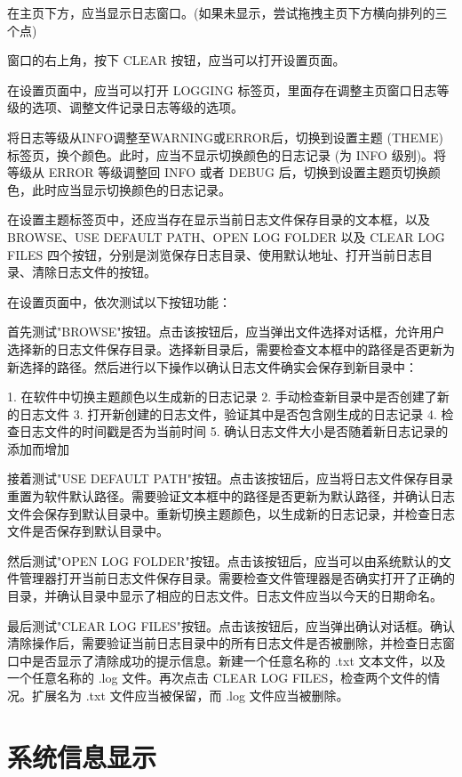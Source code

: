\documentclass[a4paper,12pt]{report}	%
\begin{document}
在主页下方，应当显示日志窗口。(如果未显示，尝试拖拽主页下方横向排列的三个点)

窗口的右上角，按下 CLEAR 按钮，应当可以打开设置页面。

在设置页面中，应当可以打开 LOGGING 标签页，里面存在调整主页窗口日志等级的选项、调整文件记录日志等级的选项。

将日志等级从INFO调整至WARNING或ERROR后，切换到设置主题 (THEME) 标签页，换个颜色。此时，应当不显示切换颜色的日志记录 (为 INFO 级别)。将等级从 ERROR 等级调整回 INFO 或者 DEBUG 后，切换到设置主题页切换颜色，此时应当显示切换颜色的日志记录。

在设置主题标签页中，还应当存在显示当前日志文件保存目录的文本框，以及BROWSE、USE DEFAULT PATH、OPEN LOG FOLDER 以及 CLEAR LOG FILES 四个按钮，分别是浏览保存日志目录、使用默认地址、打开当前日志目录、清除日志文件的按钮。

在设置页面中，依次测试以下按钮功能：

首先测试"BROWSE"按钮。点击该按钮后，应当弹出文件选择对话框，允许用户选择新的日志文件保存目录。选择新目录后，需要检查文本框中的路径是否更新为新选择的路径。然后进行以下操作以确认日志文件确实会保存到新目录中：

1. 在软件中切换主题颜色以生成新的日志记录
2. 手动检查新目录中是否创建了新的日志文件
3. 打开新创建的日志文件，验证其中是否包含刚生成的日志记录
4. 检查日志文件的时间戳是否为当前时间
5. 确认日志文件大小是否随着新日志记录的添加而增加

接着测试"USE DEFAULT PATH"按钮。点击该按钮后，应当将日志文件保存目录重置为软件默认路径。需要验证文本框中的路径是否更新为默认路径，并确认日志文件会保存到默认目录中。重新切换主题颜色，以生成新的日志记录，并检查日志文件是否保存到默认目录中。

然后测试"OPEN LOG FOLDER"按钮。点击该按钮后，应当可以由系统默认的文件管理器打开当前日志文件保存目录。需要检查文件管理器是否确实打开了正确的目录，并确认目录中显示了相应的日志文件。日志文件应当以今天的日期命名。

最后测试"CLEAR LOG FILES"按钮。点击该按钮后，应当弹出确认对话框。确认清除操作后，需要验证当前日志目录中的所有日志文件是否被删除，并检查日志窗口中是否显示了清除成功的提示信息。新建一个任意名称的 .txt 文本文件，以及一个任意名称的 .log 文件。再次点击 CLEAR LOG FILES，检查两个文件的情况。扩展名为 .txt 文件应当被保留，而 .log 文件应当被删除。

\section{系统信息显示}
\end{document}
